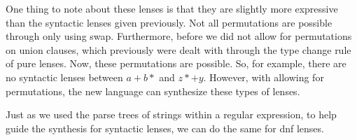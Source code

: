 One thing to note about these lenses is that they are slightly more expressive
than the syntactic lenses given previously.
Not all permutations are possible through only using swap.
Furthermore, before we did not allow for permutations on union clauses,
which previously were dealt with through the type change rule of pure lenses.
Now, these permutations are possible.  So, for example, there are no syntactic lenses
between $a+b*$ and $z*+y$.  However, with allowing for permutations, the new
language can synthesize these types of lenses.

Just as we used the parse trees of strings within a regular expression,
to help guide the synthesis for syntactic lenses, we can do the same
for dnf lenses.



